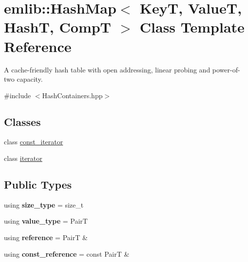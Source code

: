 \hypertarget{classemlib_1_1_hash_map}{\section{emlib\+:\+:Hash\+Map$<$ Key\+T, Value\+T, Hash\+T, Comp\+T $>$ Class Template Reference}
\label{classemlib_1_1_hash_map}
}


A cache-\/friendly hash table with open addressing, linear probing and power-\/of-\/two capacity.  




{\ttfamily \#include $<$Hash\+Containers.\+hpp$>$}

\subsection*{Classes}
\begin{DoxyCompactItemize}
\item 
class \hyperlink{classemlib_1_1_hash_map_1_1const__iterator}{const\+\_\+iterator}
\item 
class \hyperlink{classemlib_1_1_hash_map_1_1iterator}{iterator}
\end{DoxyCompactItemize}
\subsection*{Public Types}
\begin{DoxyCompactItemize}
\item 
\hypertarget{classemlib_1_1_hash_map_a028d5c5774ddb9a5600950d56d1089be}{using {\bfseries size\+\_\+type} = size\+\_\+t}\label{classemlib_1_1_hash_map_a028d5c5774ddb9a5600950d56d1089be}

\item 
\hypertarget{classemlib_1_1_hash_map_abb024ee717e5eb9beb204290275c0205}{using {\bfseries value\+\_\+type} = Pair\+T}\label{classemlib_1_1_hash_map_abb024ee717e5eb9beb204290275c0205}

\item 
\hypertarget{classemlib_1_1_hash_map_ad5eab3fa3cbd468f81eb2ac45da4fe28}{using {\bfseries reference} = Pair\+T \&}\label{classemlib_1_1_hash_map_ad5eab3fa3cbd468f81eb2ac45da4fe28}

\item 
\hypertarget{classemlib_1_1_hash_map_a4bcdc50624a3e8fd7c0d8108da5c0c79}{using {\bfseries const\+\_\+reference} = const Pair\+T \&}\label{classemlib_1_1_hash_map_a4bcdc50624a3e8fd7c0d8108da5c0c79}

\end{DoxyCompactItemize}
